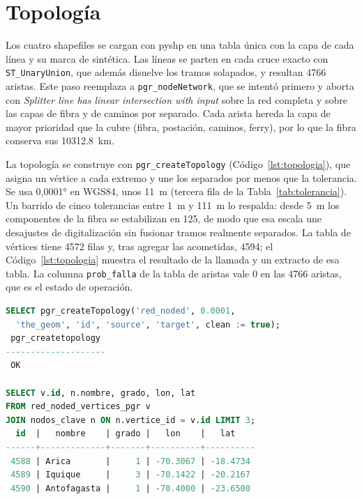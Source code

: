 \documentclass[conference]{IEEEtran}
\begin{document}
\section{Topología}
\label{sec:topologia}
Los cuatro shapefiles se cargan con pyshp en una tabla única con la capa de cada línea y su marca de sintética.
Las líneas se parten en cada cruce exacto con \texttt{ST\_UnaryUnion}, que además disuelve los tramos solapados, y resultan \num{4766} aristas.
Este paso reemplaza a \texttt{pgr\_nodeNetwork}, que se intentó primero y aborta con \emph{Splitter line has linear intersection with input} sobre la red completa y sobre las capas de fibra y de caminos por separado.
Cada arista hereda la capa de mayor prioridad que la cubre (fibra, postación, caminos, ferry), por lo que la fibra conserva sus \SI{10312,8}{km}.

La topología se construye con \texttt{pgr\_createTopology} (Código~\ref{lst:topologia}), que asigna un vértice a cada extremo y une los separados por menos que la tolerancia.
Se usa \ang{0,0001} en WGS84, unos \SI{11}{m} (tercera fila de la Tabla~\ref{tab:tolerancia}).
Un barrido de cinco tolerancias entre \SI{1}{m} y \SI{111}{m} lo respalda: desde \SI{5}{m} los componentes de la fibra se estabilizan en 125, de modo que esa escala une desajustes de digitalización sin fusionar tramos realmente separados.
La tabla de vértices tiene \num{4572} filas y, tras agregar las acometidas, \num{4594}; el Código~\ref{lst:topologia} muestra el resultado de la llamada y un extracto de esa tabla. La columna \texttt{prob\_falla} de la tabla de aristas vale 0 en las \num{4766} aristas, que es el estado de operación.

\begin{lstlisting}[language=SQL,caption={Topología (resultado OK) y extracto de la tabla de vértices, con los vértices de los primeros nodos clave.},label={lst:topologia}]
SELECT pgr_createTopology('red_noded', 0.0001,
  'the_geom', 'id', 'source', 'target', clean := true);
 pgr_createtopology
--------------------
 OK

SELECT v.id, n.nombre, grado, lon, lat
FROM red_noded_vertices_pgr v
JOIN nodos_clave n ON n.vertice_id = v.id LIMIT 3;
  id  |   nombre    | grado |   lon    |   lat
------+-------------+-------+----------+----------
 4588 | Arica       |     1 | -70.3067 | -18.4734
 4589 | Iquique     |     3 | -70.1422 | -20.2167
 4590 | Antofagasta |     1 | -70.4000 | -23.6500
\end{lstlisting}
\end{document}
